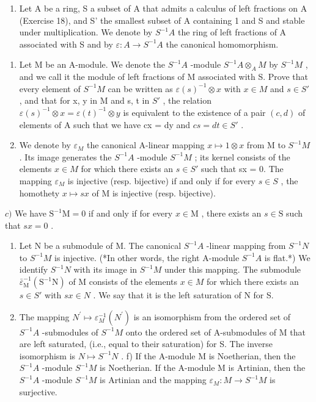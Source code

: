 \begin{enumerate}
\def\labelenumi{\arabic{enumi})}
\setcounter{enumi}{18}
\tightlist
\item
  Let A be a ring, S a subset of A that admits a calculus of left fractions on A (Exercise 18), and S' the smallest subset of A containing 1 and S and stable under multiplication. We denote by \(S^{-1}A\) the ring of left fractions of A associated with S and by \(\varepsilon:A\to S^{-1}A\) the canonical homomorphism.
\end{enumerate}

\begin{enumerate}
\def\labelenumi{\alph{enumi})}
\item
  Let M be an A-module. We denote the \(S^{-1}A\) -module \(S^{-1}A \otimes_{A} M\) by \(S^{-1}M\) , and we call it the module of left fractions of M associated with S. Prove that every element of \(S^{-1}M\) can be written as \(\varepsilon(s)^{-1} \otimes x\) with \(x \in M\) and \(s \in S'\) , and that for x, y in M and s, t in \(S'\) , the relation \(\varepsilon(s)^{-1} \otimes x = \varepsilon(t)^{-1} \otimes y\) is equivalent to the existence of a pair \((c, d)\) of elements of A such that we have cx = dy and \(cs = dt \in S'\) .
\item
  We denote by \(\varepsilon_{M}\) the canonical A-linear mapping \(x \mapsto 1 \otimes x\) from M to \(S^{-1}M\) . Its image generates the \(S^{-1}A\) -module \(S^{-1}M\) ; its kernel consists of the elements \(x \in M\) for which there exists an \(s \in S'\) such that sx = 0. The mapping \(\varepsilon_{M}\) is injective (resp. bijective) if and only if for every \(s \in S\) , the homothety \(x \mapsto sx\) of M is injective (resp. bijective).
\end{enumerate}

\(c)\) We have \(\mathrm{S}^{-1}\mathrm{M} = 0\) if and only if for every \(x\in \mathrm{M}\) , there exists an \(s\in \mathrm{S}\) such that \(sx = 0\) .

\begin{enumerate}
\def\labelenumi{\alph{enumi})}
\setcounter{enumi}{3}
\item
  Let N be a submodule of M. The canonical \(S^{-1}A\) -linear mapping from \(S^{-1}N\) to \(S^{-1}M\) is injective. (*In other words, the right A-module \(S^{-1}A\) is flat.*) We identify \(S^{-1}N\) with its image in \(S^{-1}M\) under this mapping. The submodule \(\bar{\varepsilon}_{\mathrm{M}}^{-1}(\mathrm{S}^{-1}\mathrm{N})\) of M consists of the elements \(x \in M\) for which there exists an \(s \in S'\) with \(sx \in N\) . We say that it is the left saturation of N for S.
\item
  The mapping \(N^{\prime} \mapsto \varepsilon_{M}^{-1}(N^{\prime})\) is an isomorphism from the ordered set of \(S^{-1}A\) -submodules of \(S^{-1}M\) onto the ordered set of A-submodules of M that are left saturated, (i.e., equal to their saturation) for S. The inverse isomorphism is \(N \mapsto S^{-1}N\) . f) If the A-module M is Noetherian, then the \(S^{-1}A\) -module \(S^{-1}M\) is Noetherian. If the A-module M is Artinian, then the \(S^{-1}A\) -module \(S^{-1}M\) is Artinian and the mapping \(\varepsilon_{M}: M \to S^{-1}M\) is surjective.
\end{enumerate}

